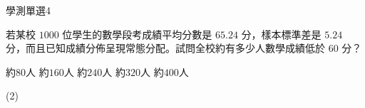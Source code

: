     \begin{QUESTION}
        \begin{ExamInfo}{91}{學測}{單選}{4}
        \end{ExamInfo}
        \begin{ExamAnsRateInfo}{35}{60}{27}{18}
        \end{ExamAnsRateInfo}
        \begin{QBODY}
            若某校 $1000$ 位學生的數學段考成績平均分數是 $65.24$ 分，樣本標準差是 $5.24$ 分，而且已知成績分佈呈現常態分配。試問全校約有多少人數學成績低於 $60$ 分？
            \begin{QOPS}
                \QOP 約$80$人  
                \QOP 約$160$人 
                \QOP 約$240$人 
                \QOP 約$320$人 
                \QOP 約$400$人
            \end{QOPS}
        \end{QBODY}
        \begin{QFROMS}
        \end{QFROMS}
        \begin{QTAGS}\end{QTAGS}
        \begin{QANS}
            (2)
        \end{QANS}
        \begin{QSOLLIST}
        \end{QSOLLIST}
        \begin{QEMPTYSPACE}
        \end{QEMPTYSPACE}
    \end{QUESTION}
